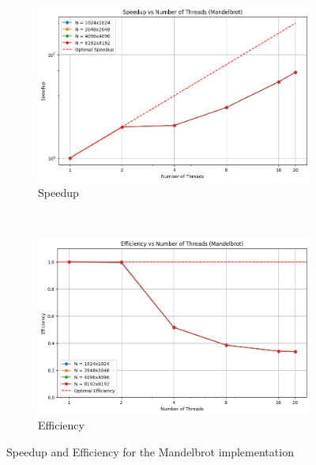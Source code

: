 \begin{figure}[H]
    \centering
    \begin{subfigure}[b]{\textwidth}
        \centering
        \includegraphics[width=\textwidth]{../media/mandel_speedup.png}
        \caption{Speedup}
        \label{fig:image1}
    \end{subfigure}
    \hfill \\
    \begin{subfigure}[b]{\textwidth}
        \centering
        \includegraphics[width=\textwidth]{../media/mandel_eff.png}
        \caption{Efficiency}
        \label{fig:image2}
    \end{subfigure}
    \caption{Speedup and Efficiency for the Mandelbrot implementation}
    \label{fig:mandel}
\end{figure}


 

